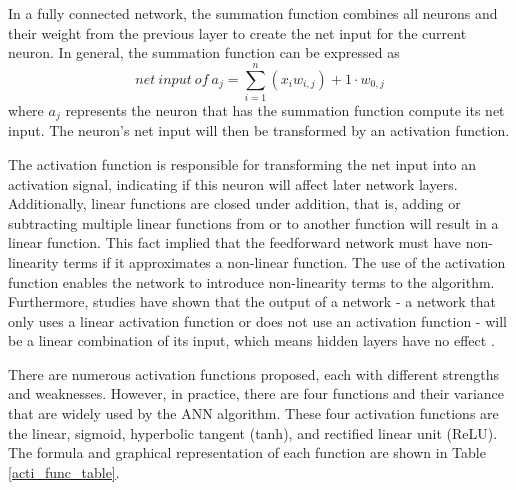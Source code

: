 \noindent In a fully connected network, the summation function combines all neurons and their weight from the previous layer to create the net input for the current neuron. In general, the summation function can be expressed as \[net\ input\ of\ a_j = \sum_{i=1}^n (x_i w_{i,j}) + 1 \cdot w_{0,j}\] where $a_j$ represents the neuron that has the summation function compute its net input. The neuron's net input will then be transformed by an activation function.

The activation function is responsible for transforming the net input into an activation signal, indicating if this neuron will affect later network layers. Additionally, linear functions are closed under addition, that is, adding or subtracting multiple linear functions from or to another function will result in a linear function. This fact implied that the feedforward network must have non-linearity terms if it approximates a non-linear function. The use of the activation function enables the network to introduce non-linearity terms to the algorithm. Furthermore, studies have shown that the output of a network - a network that only uses a linear activation function or does not use an activation function - will be a linear combination of its input, which means hidden layers have no effect \cite{He_2015_ICCV}.

There are numerous activation functions proposed, each with different strengths and weaknesses. However, in practice, there are four functions and their variance that are widely used by the ANN algorithm. These four activation functions are the linear, sigmoid, hyperbolic tangent (tanh), and rectified linear unit (ReLU). The formula and graphical representation of each function are shown in Table \ref{acti_func_table}.

